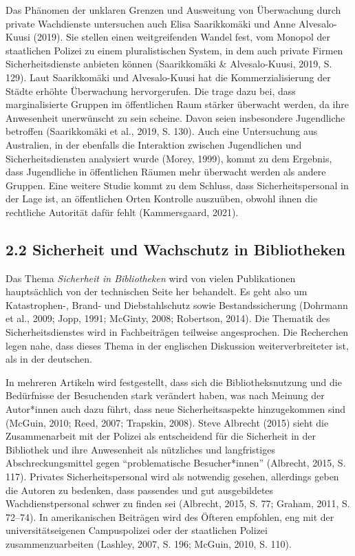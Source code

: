 \documentclass[a4paper,
fontsize=11pt,
oneside,
numbers=noperiodatend,
parskip=half-,
bibliography=totoc,
final
]{scrartcl}
\begin{document}
Das Phänomen der unklaren Grenzen und Ausweitung von Überwachung durch
private Wachdienste untersuchen auch Elisa Saarikkomäki und Anne
Alvesalo-Kuusi (2019). Sie stellen einen weitgreifenden Wandel fest, vom
Monopol der staatlichen Polizei zu einem pluralistischen System, in dem
auch private Firmen Sicherheitsdienste anbieten können (Saarikkomäki \&
Alvesalo-Kuusi, 2019, S. 129). Laut Saarikkomäki und Alvesalo-Kuusi hat
die Kommerzialisierung der Städte erhöhte Überwachung hervorgerufen. Die
trage dazu bei, dass marginalisierte Gruppen im öffentlichen Raum
stärker überwacht werden, da ihre Anwesenheit unerwünscht zu sein
scheine. Davon seien insbesondere Jugendliche betroffen (Saarikkomäki et
al., 2019, S. 130). Auch eine Untersuchung aus Australien, in der
ebenfalls die Interaktion zwischen Jugendlichen und Sicherheitsdiensten
analysiert wurde (Morey, 1999), kommt zu dem Ergebnis, dass Jugendliche
in öffentlichen Räumen mehr überwacht werden als andere Gruppen. Eine
weitere Studie kommt zu dem Schluss, dass Sicherheitspersonal in der
Lage ist, an öffentlichen Orten Kontrolle auszuüben, obwohl ihnen die
rechtliche Autorität dafür fehlt (Kammersgaard, 2021).

\hypertarget{sicherheit-und-wachschutz-in-bibliotheken}{%
\subsection{2.2 Sicherheit und Wachschutz in
Bibliotheken}\label{sicherheit-und-wachschutz-in-bibliotheken}}

Das Thema \emph{Sicherheit in Bibliotheken} wird von vielen
Publikationen hauptsächlich von der technischen Seite her behandelt. Es
geht also um Katastrophen-, Brand- und Diebstahlschutz sowie
Bestandssicherung (Dohrmann et al., 2009; Jopp, 1991; McGinty, 2008;
Robertson, 2014). Die Thematik des Sicherheitsdienstes wird in
Fachbeiträgen teilweise angesprochen. Die Recherchen legen nahe, dass
dieses Thema in der englischen Diskussion weiterverbreiteter ist, als in
der deutschen.

In mehreren Artikeln wird festgestellt, dass sich die Bibliotheksnutzung
und die Bedürfnisse der Besuchenden stark verändert haben, was nach
Meinung der Autor*innen auch dazu führt, dass neue Sicherheitsaspekte
hinzugekommen sind (McGuin, 2010; Reed, 2007; Trapskin, 2008). Steve
Albrecht (2015) sieht die Zusammenarbeit mit der Polizei als
entscheidend für die Sicherheit in der Bibliothek und ihre Anwesenheit
als nützliches und langfristiges Abschreckungsmittel gegen
\enquote{problematische Besucher*innen} (Albrecht, 2015, S. 117).
Privates Sicherheitspersonal wird als notwendig gesehen, allerdings
geben die Autoren zu bedenken, dass passendes und gut ausgebildetes
Wachdienstpersonal schwer zu finden sei (Albrecht, 2015, S. 77; Graham,
2011, S. 72--74). In amerikanischen Beiträgen wird des Öfteren
empfohlen, eng mit der universitätseigenen Campuspolizei oder der
staatlichen Polizei zusammenzuarbeiten (Lashley, 2007, S. 196; McGuin,
2010, S. 110).
\end{document}
